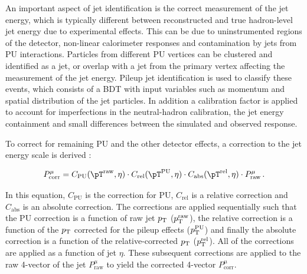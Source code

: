 An important aspect of jet identification is the correct measurement of the jet
energy, which is typically different between reconstructed and true hadron-level jet energy
due to experimental effects. This can be due to uninstrumented regions of the
detector, non-linear calorimeter responses and contamination by jets from \ac{PU}
interactions. Particles from different \ac{PU} vertices can be clustered and identified as a
jet, or overlap with a jet from the primary vertex affecting the measurement of the jet energy.
Pileup jet identification \cite{CMS-PAS-JME-13-005} is used to classify these events, which consists
of a \ac{BDT} \cite{TMVA} with input variables such as
momentum and spatial distribution of the jet particles. In addition
a calibration factor is applied to account for imperfections in the
neutral-hadron calibration, the jet energy containment and small differences
between the simulated and observed response.

To correct for remaining \ac{PU} and the other detector effects, a correction to the jet energy
scale is derived \cite{CMS-JME-10-011}:


\begin{equation}
P_{\text{corr}}^{\mu} = C_{\text{PU}}(\pT^{\text{raw}},\eta) \cdot
C_{\text{rel}}(\pT^{\text{PU}},\eta) \cdot C_{\text{abs}}(\pT^{\text{rel}},\eta) \cdot
P_{\text{raw}}^{\mu}\, .
\end{equation}

In this equation, $C_{\text{PU}}$ is the correction for \ac{PU},
$C_{\text{rel}}$ is a relative correction and $C_{\text{abs}}$ is an absolute
correction. The corrections are applied sequentially such that the \ac{PU}
correction is a function of raw jet $p_{\mathrm{T}}$ ($p_{\mathrm{T}}^{\text{raw}}$),
the relative correction is a function
of the $p_{\mathrm{T}}$ corrected for the pileup effects ($p_{\mathrm{T}}^{\text{PU}}$) and finally
the absolute correction is a function of the relative-corrected $p_{\mathrm{T}}$
($p_{\mathrm{T}}^{\text{rel}}$). All of the corrections are applied as a function of
jet $\eta$. These subsequent corrections are applied to the raw
4-vector of the jet $P_{\text{raw}}^{\mu}$ to yield the corrected 4-vector
$P_{\text{corr}}^{\mu}$.

